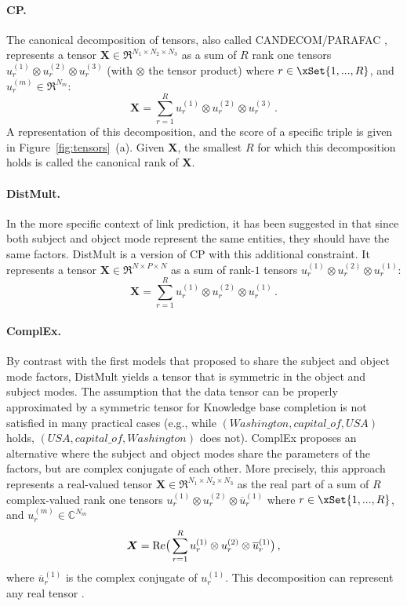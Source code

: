\documentclass{article}
\newcommand{\tensor}[1]{{\bm #1}}
\newcommand{\CP}{{CP}\xspace}
\newcommand{\complex}{{ComplEx}\xspace}
\newcommand{\distmult}{{DistMult}\xspace}
\newcommand{\tens}[1]{\tensor{#1}}
\newcommand{\nents}{N}
\newcommand{\nrels}{P}
\newcommand{\unkn}{X}
\newcommand{\Co}{\mathbb{C}}
\begin{document}
\paragraph{\CP.} The canonical decomposition of tensors, also called CANDECOM/PARAFAC \citep{hitchcock_expression_1927}, represents a tensor $\tens{\unkn}\in\Re^{\nents_1\times\nents_2\times\nents_3}$ as a sum of $R$ rank one tensors $u^{(1)}_r \otimes u^{(2)}_r \otimes u^{(3)}_r$ (with $\otimes$ the tensor product) where $r\in\xSet{1,...,R}$, and $u^{(m)}_r\in\Re^{\nents_m}$:
\begin{equation*}
\tens{\unkn} = \sum_{r=1}^R u^{(1)}_r \otimes u^{(2)}_r \otimes u^{(3)}_r\,.
\end{equation*}
A representation of this decomposition, and the score of a specific triple is given in Figure~\ref{fig:tensors}~(a).
Given $\tens{\unkn}$, the smallest $R$ for which this decomposition holds is called the canonical rank of $\tens{\unkn}$. 

\paragraph{\distmult.} In the more specific context of link prediction, it has been suggested in \citet{bordes_learning_2011,nickel_three-way_2011} that since both subject and object mode represent the same entities, they should have the same factors. \distmult \citep{yang_embedding_2014} is a version of \CP with this additional constraint. It represents a tensor $\tens{\unkn}\in\Re^{\nents\times\nrels\times\nents}$ as a sum of rank-$1$ tensors $u^{(1)}_r \otimes u^{(2)}_r \otimes u^{(1)}_r$:
\begin{equation*}
\tens{\unkn} = \sum_{r=1}^R u^{(1)}_r \otimes u^{(2)}_r \otimes u^{(1)}_r\,.
\end{equation*}
\paragraph{\complex.} By contrast with the first models that proposed to share the subject and object mode factors, \distmult yields a tensor that is symmetric in the object and subject modes. The assumption that the data tensor can be properly approximated by a symmetric tensor for Knowledge base completion is not satisfied in many practical cases (e.g., while $(W\!ashington, capital\_of, U\!S\!A)$ holds, $(U\!S\!A, capital\_of, W\!ashington)$ does not). \complex \citep{trouillon_complex_2016} proposes an alternative where the subject and object modes share the parameters of the factors, but are complex conjugate of each other. More precisely, this approach represents a real-valued tensor $\tens{\unkn}\in\Re^{\nents_1\times\nents_2\times\nents_3}$ as the real part of a sum of $R$ complex-valued rank one tensors $u^{(1)}_r \otimes u^{(2)}_r \otimes \overline{u}^{(1)}_r$ where $r\in\xSet{1,...,R}$, and $u^{(m)}_r\in\Co^{\nents_m}$
\begin{equation*}
\tens{\unkn} = {\rm Re}\big(\sum_{r=1}^R u^{(1)}_r \otimes u^{(2)}_r \otimes \overline{u}^{(1)}_r\big)\,,
\end{equation*}
where $\overline{u}^{(1)}_r$ is the complex conjugate of $u^{(1)}_r$. This decomposition can represent any real tensor \citep{trouillon_complex_2016}.
\end{document}
